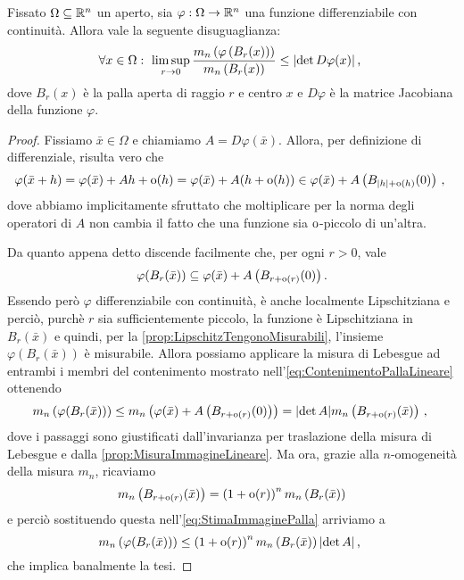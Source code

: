 \begin{lemma}\label{lemma:LimiteDeterminante}
	Fissato $\Omega\subseteq\mathbb R^n$ un aperto, sia $\varphi:\Omega\to\mathbb R^n$ una funzione differenziabile con continuità.
	Allora vale la seguente disuguaglianza:
	\begin{equation*}
		\forall x\in\Omega:\ \limsup_{r\to 0} \frac{ m_n\left(\varphi\left(B_r(x)\right)\right)} {m_n\left(B_r(x)\right)}\le \lvert\det D\varphi(x)\rvert \, \text{, } 
	\end{equation*}
	dove $B_r(x)$ è la palla aperta di raggio $r$ e centro $x$ e $D\varphi$ è la matrice Jacobiana della funzione $\varphi$.
\end{lemma}
\begin{proof}
	Fissiamo $\bar x\in\Omega$ e chiamiamo $A=D \varphi(\bar x)$.
	Allora, per definizione di differenziale, risulta vero che
	\begin{equation*}
		\varphi(\bar x+h)=\varphi(\bar x)+Ah+\mathrm{o}(h)=\varphi(\bar x)+A(h+\mathrm{o}(h))\in \varphi(\bar x)+A\left(B_{|h|+\mathrm{o}(h)}(0)\right) \, \text{, }
	\end{equation*}
	dove abbiamo implicitamente sfruttato che moltiplicare per la norma degli operatori di $A$ non cambia il fatto che una funzione sia $\mathrm{o}$-piccolo di un'altra.
	
	Da quanto appena detto discende facilmente che, per ogni $r>0$, vale
	\begin{equation}\label{eq:ContenimentoPallaLineare}
		\varphi(B_r(\bar x))\subseteq \varphi(\bar x)+A\left(B_{r+\mathrm{o}(r)}(0)\right).
	\end{equation}
	Essendo però $\varphi$ differenziabile con continuità, è anche localmente Lipschitziana e perciò, purchè $r$ sia sufficientemente piccolo, la funzione è Lipschitziana in $B_r(\bar x)$ e quindi, per la \cref{prop:LipschitzTengonoMisurabili}, l'insieme $\varphi(B_r(\bar x))$ è misurabile.
	Allora possiamo applicare la misura di Lebesgue ad entrambi i membri del contenimento mostrato nell'\cref{eq:ContenimentoPallaLineare} ottenendo
	\begin{equation}\label{eq:StimaImmaginePalla}
		m_n\left( \varphi(B_r(\bar x)) \right)\le m_n\left(\varphi(\bar x)+A\left(B_{r+\mathrm{o}(r)}(0)\right)\right)
		=\lvert \det A\rvert m_n\left(B_{r+\mathrm{o}(r)}(\bar x)\right)\, \text{, }
	\end{equation}
	dove i passaggi sono giustificati dall'invarianza per traslazione della misura di Lebesgue e dalla \cref{prop:MisuraImmagineLineare}.
	Ma ora, grazie alla $n$-omogeneità della misura $m_n$, ricaviamo
	\begin{equation*} 
		m_n\left(B_{r+\mathrm{o}(r)}(\bar x)\right)=\left(1+\mathrm{o}(r)\right)^n m_n\left( B_r(\bar x)\right)
	\end{equation*}
	e perciò sostituendo questa nell'\cref{eq:StimaImmaginePalla} arriviamo a
	\begin{equation*}
		m_n\left( \varphi(B_r(\bar x)) \right)\le \left(1+\mathrm{o}(r)\right)^n m_n\left( B_r(\bar x)\right)\lvert \det A\rvert \, \text{, }
	\end{equation*}
	che implica banalmente la tesi.
\end{proof}


